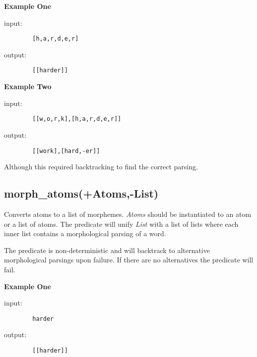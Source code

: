 \textbf{Example One}\newline

 input:

        \begin{verbatim}
        [h,a,r,d,e,r]\end{verbatim}

output:

        \begin{verbatim}
        [[harder]]\end{verbatim}

\textbf{Example Two}\newline

input:

        \begin{verbatim}
        [[w,o,r,k],[h,a,r,d,e,r]]\end{verbatim}

output:

        \begin{verbatim}
        [[work],[hard,-er]]\end{verbatim} Although this required
        backtracking to find the correct parsing.


\subsection{morph\_atoms(+Atoms,-List)}

Converts atoms to a list of morphemes. \emph{Atoms} should be
instantiated to an atom or a list of atoms.  The predicate will
unify \emph{List} with a list of lists where each inner list
contains a morphological parsing of a word.\newline

The predicate is non-deterministic and will backtrack to
alternative morphological parsings upon failure.  If there are no
alternatives the predicate will fail.\newline

\textbf{Example One}\newline

input:

        \begin{verbatim}
        harder\end{verbatim}

output:

        \begin{verbatim}
        [[harder]]\end{verbatim}

